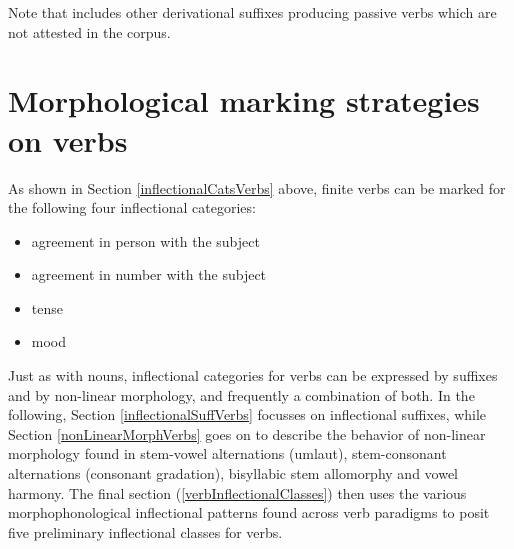 Note that \citet{Ruong1945} includes other derivational suffixes producing passive verbs which are not attested in the corpus. 


\section{Morphological marking strategies on verbs}\label{markingVerbs}
As shown in Section \ref{inflectionalCatsVerbs} above, finite verbs can be marked for the following four inflectional categories: 
\begin{itemize}
\item{agreement in person with the subject}
\item{agreement in number with the subject}
\item{tense}
\item{mood}
\end{itemize}
Just as with nouns, inflectional categories for verbs can be expressed by suffixes and by non-linear morphology, and frequently a combination of both. In the following, Section \ref{inflectionalSuffVerbs} focusses on inflectional suffixes, while Section \ref{nonLinearMorphVerbs} goes on to describe the behavior of non-linear morphology found in stem-vowel alternations (umlaut), stem-consonant alternations (consonant gradation), bisyllabic stem allomorphy and vowel harmony. The final section (\ref{verbInflectionalClasses}) then uses the various morphophonological inflectional patterns found across verb paradigms to posit five preliminary inflectional classes for verbs.


\newcommand{\Xp}[1]{\MC{1}{x{80pt}|}{#1}}%

